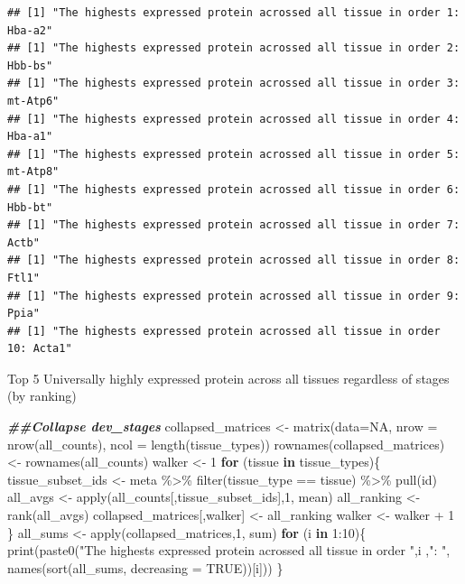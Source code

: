 \documentclass[
]{article}
\newenvironment{Shaded}{\begin{snugshade}}{\end{snugshade}}
\newcommand{\AttributeTok}[1]{\textcolor[rgb]{0.77,0.63,0.00}{#1}}
\newcommand{\ConstantTok}[1]{\textcolor[rgb]{0.00,0.00,0.00}{#1}}
\newcommand{\ControlFlowTok}[1]{\textcolor[rgb]{0.13,0.29,0.53}{\textbf{#1}}}
\newcommand{\DecValTok}[1]{\textcolor[rgb]{0.00,0.00,0.81}{#1}}
\newcommand{\DocumentationTok}[1]{\textcolor[rgb]{0.56,0.35,0.01}{\textbf{\textit{#1}}}}
\newcommand{\FunctionTok}[1]{\textcolor[rgb]{0.00,0.00,0.00}{#1}}
\newcommand{\NormalTok}[1]{#1}
\newcommand{\OtherTok}[1]{\textcolor[rgb]{0.56,0.35,0.01}{#1}}
\newcommand{\SpecialCharTok}[1]{\textcolor[rgb]{0.00,0.00,0.00}{#1}}
\newcommand{\StringTok}[1]{\textcolor[rgb]{0.31,0.60,0.02}{#1}}
\begin{document}
\begin{verbatim}
## [1] "The highests expressed protein acrossed all tissue in order 1: Hba-a2"
## [1] "The highests expressed protein acrossed all tissue in order 2: Hbb-bs"
## [1] "The highests expressed protein acrossed all tissue in order 3: mt-Atp6"
## [1] "The highests expressed protein acrossed all tissue in order 4: Hba-a1"
## [1] "The highests expressed protein acrossed all tissue in order 5: mt-Atp8"
## [1] "The highests expressed protein acrossed all tissue in order 6: Hbb-bt"
## [1] "The highests expressed protein acrossed all tissue in order 7: Actb"
## [1] "The highests expressed protein acrossed all tissue in order 8: Ftl1"
## [1] "The highests expressed protein acrossed all tissue in order 9: Ppia"
## [1] "The highests expressed protein acrossed all tissue in order 10: Acta1"
\end{verbatim}

Top 5 Universally highly expressed protein across all tissues regardless
of stages (by ranking)

\begin{Shaded}
\begin{Highlighting}[]
\DocumentationTok{\#\#Collapse dev\_stages}
\NormalTok{collapsed\_matrices }\OtherTok{\textless{}{-}} \FunctionTok{matrix}\NormalTok{(}\AttributeTok{data=}\ConstantTok{NA}\NormalTok{, }\AttributeTok{nrow =} \FunctionTok{nrow}\NormalTok{(all\_counts), }\AttributeTok{ncol =} \FunctionTok{length}\NormalTok{(tissue\_types))}
\FunctionTok{rownames}\NormalTok{(collapsed\_matrices) }\OtherTok{\textless{}{-}} \FunctionTok{rownames}\NormalTok{(all\_counts)}
\NormalTok{walker }\OtherTok{\textless{}{-}} \DecValTok{1}
\ControlFlowTok{for}\NormalTok{ (tissue }\ControlFlowTok{in}\NormalTok{ tissue\_types)\{}
\NormalTok{  tissue\_subset\_ids }\OtherTok{\textless{}{-}}\NormalTok{ meta }\SpecialCharTok{\%\textgreater{}\%} \FunctionTok{filter}\NormalTok{(tissue\_type }\SpecialCharTok{==}\NormalTok{ tissue) }\SpecialCharTok{\%\textgreater{}\%} \FunctionTok{pull}\NormalTok{(id)}
\NormalTok{  all\_avgs }\OtherTok{\textless{}{-}} \FunctionTok{apply}\NormalTok{(all\_counts[,tissue\_subset\_ids],}\DecValTok{1}\NormalTok{, mean)}
\NormalTok{  all\_ranking }\OtherTok{\textless{}{-}} \FunctionTok{rank}\NormalTok{(all\_avgs)}
\NormalTok{  collapsed\_matrices[,walker] }\OtherTok{\textless{}{-}}\NormalTok{ all\_ranking}
\NormalTok{  walker }\OtherTok{\textless{}{-}}\NormalTok{ walker }\SpecialCharTok{+} \DecValTok{1}
\NormalTok{\}}
\NormalTok{all\_sums }\OtherTok{\textless{}{-}} \FunctionTok{apply}\NormalTok{(collapsed\_matrices,}\DecValTok{1}\NormalTok{, sum)}
\ControlFlowTok{for}\NormalTok{ (i }\ControlFlowTok{in} \DecValTok{1}\SpecialCharTok{:}\DecValTok{10}\NormalTok{)\{}
  \FunctionTok{print}\NormalTok{(}\FunctionTok{paste0}\NormalTok{(}\StringTok{"The highests expressed protein acrossed all tissue in order "}\NormalTok{,i ,}\StringTok{": "}\NormalTok{, }\FunctionTok{names}\NormalTok{(}\FunctionTok{sort}\NormalTok{(all\_sums, }\AttributeTok{decreasing =} \ConstantTok{TRUE}\NormalTok{))[i]))}
\NormalTok{\}}
\end{Highlighting}
\end{Shaded}
\end{document}
